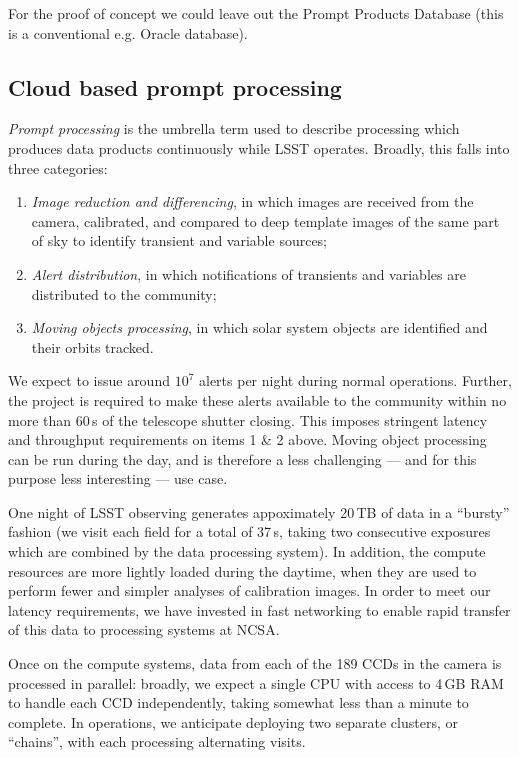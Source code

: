 For the proof of concept we could leave out the Prompt Products Database (this is a conventional e.g. Oracle database).

\subsection{Cloud based prompt processing}\label{sect:pp}

\textit{Prompt processing}  is the umbrella term used to describe processing which produces data products continuously while LSST operates.
Broadly, this falls into three categories:

\begin{enumerate}

\item{\textit{Image reduction and differencing}, in which images are received from the camera, calibrated, and compared to deep template images of the same part of sky to identify transient and variable sources;}
\item{\textit{Alert distribution}, in which notifications of transients and variables are distributed to the community;}
\item{\textit{Moving objects processing}, in which solar system objects are identified and their orbits tracked.}

\end{enumerate}

We expect to issue around $10^7$ alerts per night during normal operations.
Further, the project is required to make these alerts available to the community within no more than 60\,s of the telescope shutter closing.
This imposes stringent latency and throughput requirements on items 1 \& 2 above.
Moving object processing can be run during the day, and is therefore a less challenging — and for this purpose less interesting — use case.

One night of LSST observing generates appoximately 20\,TB of data in a ``bursty'' fashion (we visit each field for a total of 37\,s, taking two consecutive exposures which are combined by the data processing system).
In addition, the compute resources are more lightly loaded during the daytime, when they are used to perform fewer and simpler analyses of calibration images.
In order to meet our latency requirements, we have invested in fast networking to enable rapid transfer of this data to processing systems at NCSA.

Once on the compute systems, data from each of the 189 CCDs in the camera is processed in parallel: broadly, we expect a single CPU with access to 4\,GB RAM to handle each CCD independently, taking somewhat less than a minute to complete.
In operations, we anticipate deploying two separate clusters, or ``chains'', with each processing alternating visits.


